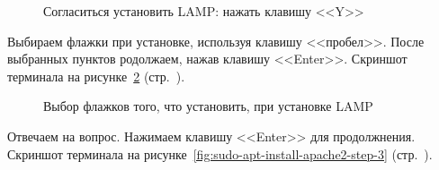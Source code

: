 \begin{figure}[p]
    \caption{Согласиться установить LAMP: нажать клавишу <<Y>>}
    \label{fig:sudo-apt-install-apache2-step-1}
\end{figure}

Выбираем флажки при установке, используя клавишу <<пробел>>. После выбранных пунктов родолжаем, нажав клавишу <<Enter>>.
Скриншот терминала на рисунке~\ref{fig:sudo-apt-install-apache2-step-2} (стр.~\pageref{fig:sudo-apt-install-apache2-step-2}).

\begin{figure}[p]
    \caption{Выбор флажков того, что установить, при установке LAMP}
    \label{fig:sudo-apt-install-apache2-step-2}
\end{figure}

Отвечаем на вопрос. Нажимаем клавишу <<Enter>> для продолжнения.
Скриншот терминала на рисунке~\ref{fig:sudo-apt-install-apache2-step-3} (стр.~\pageref{fig:sudo-apt-install-apache2-step-3}).


